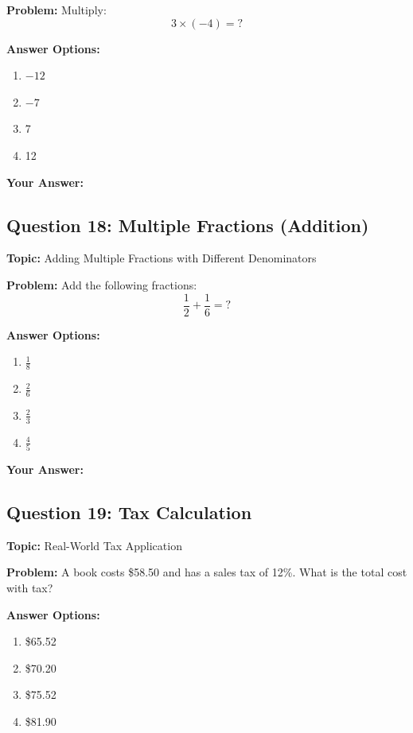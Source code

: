 \documentclass[12pt]{article}
\begin{document}
\textbf{Problem:} Multiply:
\[3 \times (-4) = ?\]

\textbf{Answer Options:}
\begin{enumerate}[label=\Alph*)]
    \item $-12$
    \item $-7$
    \item 7
    \item 12
\end{enumerate}

\noindent\textbf{Your Answer:} \underline{\hspace{2cm}}

\vspace{0.5cm}


\subsection{Question 18: Multiple Fractions (Addition)}
\textbf{Topic:} Adding Multiple Fractions with Different Denominators

\textbf{Problem:} Add the following fractions:
\[\frac{1}{2} + \frac{1}{6} = ?\]

\textbf{Answer Options:}
\begin{enumerate}[label=\Alph*)]
    \item $\frac{1}{8}$
    \item $\frac{2}{6}$
    \item $\frac{2}{3}$
    \item $\frac{4}{5}$
\end{enumerate}

\noindent\textbf{Your Answer:} \underline{\hspace{2cm}}

\vspace{0.5cm}


\subsection{Question 19: Tax Calculation}
\textbf{Topic:} Real-World Tax Application

\textbf{Problem:} A book costs \$58.50 and has a sales tax of 12\%. What is the total cost with tax?

\textbf{Answer Options:}
\begin{enumerate}[label=\Alph*)]
    \item \$65.52
    \item \$70.20
    \item \$75.52
    \item \$81.90
\end{enumerate}
\end{document}
